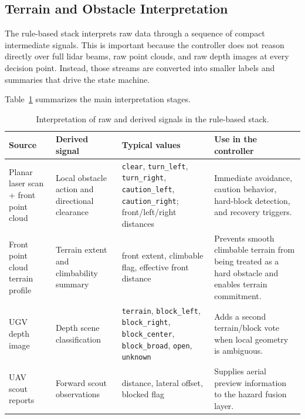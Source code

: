 \subsection{Terrain and Obstacle Interpretation}

The rule-based stack interprets raw data through a sequence of compact intermediate signals. This is important because the controller does not reason directly over full lidar beams, raw point clouds, and raw depth images at every decision point. Instead, those streams are converted into smaller labels and summaries that drive the state machine.

Table~\ref{tab:data_interpretation} summarizes the main interpretation stages.

\begin{table}[tbp]
    \caption{Interpretation of raw and derived signals in the rule-based stack.}
    \label{tab:data_interpretation}
    \centering
    \small
    \setlength{\tabcolsep}{4pt}
    \renewcommand{\arraystretch}{1.15}
    \begin{tabularx}{\textwidth}{@{}>{\raggedright\arraybackslash}p{}>{\raggedright\arraybackslash}p{}>{\raggedright\arraybackslash}p{}X@{}}
        \toprule
        \textbf{Source} & \textbf{Derived signal} & \textbf{Typical values} & \textbf{Use in the controller} \\
        \midrule
        Planar laser scan + front point cloud & Local obstacle action and directional clearance & \texttt{clear}, \texttt{turn\_left}, \texttt{turn\_right}, \texttt{caution\_left}, \texttt{caution\_right}; front/left/right distances & Immediate avoidance, caution behavior, hard-block detection, and recovery triggers. \\
        Front point cloud terrain profile & Terrain extent and climbability summary & front extent, climbable flag, effective front distance & Prevents smooth climbable terrain from being treated as a hard obstacle and enables terrain commitment. \\
        UGV depth image & Depth scene classification & \texttt{terrain}, \texttt{block\_left}, \texttt{block\_right}, \texttt{block\_center}, \texttt{block\_broad}, \texttt{open}, \texttt{unknown} & Adds a second terrain/block vote when local geometry is ambiguous. \\
        UAV scout reports & Forward scout observations & distance, lateral offset, blocked flag & Supplies aerial preview information to the hazard fusion layer. \\

\end{tabularx}
\end{table}
